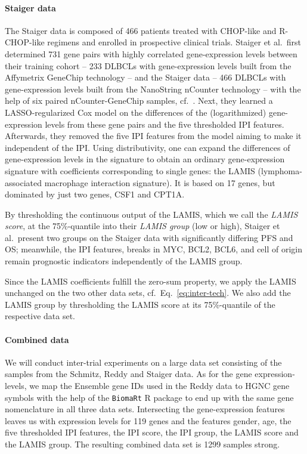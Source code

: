 \paragraph{Staiger data}

The Staiger data is composed of \num{466} patients treated with CHOP-like and R-CHOP-like regimens 
and enrolled in prospective clinical trials. 
Staiger et al.\ first determined \num{731} gene pairs with highly correlated gene-expression levels 
between their training cohort -- \num{233} DLBCLs with gene-expression levels built from the Affymetrix 
GeneChip technology -- and the Staiger data -- \num{466} DLBCLs with gene-expression levels built 
from the NanoString nCounter technology -- with the help of six paired nCounter-GeneChip samples, cf.\ 
\cite[Supplementary Methods]{staiger20}.
Next, they learned a LASSO-regularized Cox model on the differences of the (logarithmized) 
gene-expression levels from these gene pairs and the five thresholded IPI features.
Afterwards, they removed the five IPI features from the model aiming to make it independent of the 
IPI. Using distributivity, one can expand the differences of gene-expression levels in the 
signature to obtain an ordinary 
gene-expression signature with coefficients corresponding to single genes: the LAMIS 
(lymphoma-associated macrophage interaction signature). It is 
based on \num{17} genes, but dominated by just two genes, CSF1 and CPT1A. 

By thresholding the 
continuous output of the LAMIS, which we call the \textit{LAMIS score}, at the 75\%-quantile into 
their \textit{LAMIS group} (low or high), Staiger et al.\ present two 
groups on the Staiger data with significantly differing PFS and OS; 
meanwhile, the IPI features, breaks in MYC, BCL2, BCL6, and cell of origin remain prognostic 
indicators independently of the LAMIS group.

Since the LAMIS coefficients fulfill the 
zero-sum property, we apply the LAMIS unchanged on the two other data sets, cf.\ Eq.\ 
\eqref{eq:inter-tech}. We also add the LAMIS group by thresholding the LAMIS score at its 
75\%-quantile of the respective data set.

\paragraph{Combined data}

We will conduct inter-trial experiments on a large data set consisting of the samples from the 
Schmitz, Reddy and Staiger data. As for the gene expression-levels, we map the Ensemble gene IDs 
used in the Reddy data to HGNC gene symbols with the help of the \texttt{BiomaRt} R package 
\cite{biomart09}
to end up with the same gene nomenclature in all three data sets. Intersecting the gene-expression 
features leaves us with expression levels for \num{119} genes and the features gender, age, 
the five thresholded IPI features, the IPI score, the IPI group, the LAMIS score and the LAMIS 
group. The resulting combined data set is \num{1299} samples strong.

